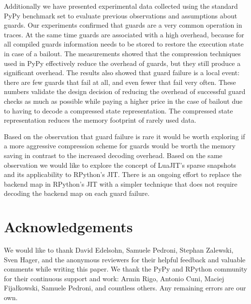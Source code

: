 \documentclass[10pt,preprint]{sigplanconf}
\begin{document}
Additionally we have presented experimental data collected using the standard PyPy
benchmark set to evaluate previous observations and assumptions about guards. Our
experiments confirmed that guards are a very common
operation in traces. At the same time guards are associated with a high
overhead, because for all compiled guards information needs to be
stored to restore the execution state in case of a bailout. The measurements
showed that the compression techniques used in PyPy effectively reduce the
overhead of guards, but they still produce a significant overhead. The results
also showed that guard failure is a local event: there are few
guards that fail at all, and even fewer that fail very often.
These numbers validate the design decision of reducing the overhead of
successful guard checks as much as possible while paying a higher price in the
case of bailout due to having to decode a compressed state representation.
The compressed state representation reduces the memory footprint of rarely
used data.

Based on the observation that guard failure is rare it
would be worth exploring if a more aggressive compression scheme for guards
would be worth the memory saving in contrast to the increased decoding
overhead. Based on the same observation we would like to explore the concept of
LuaJIT's sparse snapshots and its applicability to RPython's JIT.
There is an ongoing effort to replace the backend map in RPython's JIT with a
simpler technique that does not require decoding the backend map on each guard
failure.

\section*{Acknowledgements}
We would like to thank David Edelsohn, Samuele Pedroni, Stephan Zalewski, Sven
Hager, and the anonymous reviewers for their helpful
feedback and valuable comments while writing this paper.
We thank the PyPy and RPython community for their continuous support and work:
Armin Rigo, Antonio Cuni, Maciej Fijałkowski, Samuele Pedroni, and countless
others. Any remaining errors are our own.



%    


\listoftodos
\end{document}
